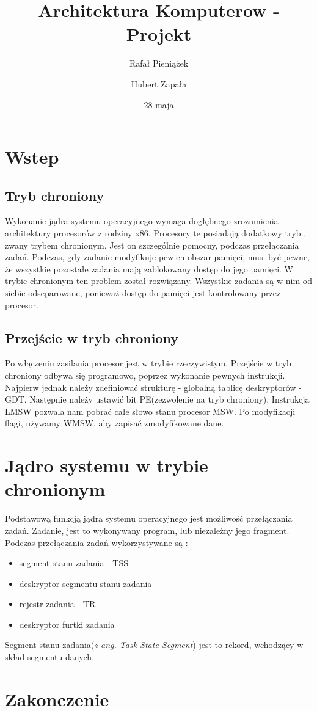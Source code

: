 \documentclass[a4paper,12pt]{report}
\title{Architektura Komputerow - Projekt}
\author{Rafał Pieniążek \and Hubert Zapała}
\date{28 maja}
\begin{document}
\maketitle
\tableofcontents %

	
	\section{Wstep}

	\subsection{Tryb chroniony}
	Wykonanie jądra systemu operacyjnego wymaga dogłębnego zrozumienia architektury procesorów z rodziny x86. Procesory te posiadają dodatkowy tryb , zwany trybem chronionym. Jest on szczególnie pomocny, podczas przełączania zadań. Podczas, gdy zadanie modyfikuje pewien obszar pamięci, musi być pewne, że wszystkie pozostałe zadania mają zablokowany dostęp do jego pamięci. W trybie chronionym ten problem został rozwiązany. Wszystkie zadania są w nim od siebie odseparowane, ponieważ dostęp do pamięci jest kontrolowany przez procesor. 

	\subsection{Przejście w tryb chroniony}
	Po włączeniu zasilania procesor jest w trybie rzeczywistym. Przejście w tryb chroniony odbywa się programowo, poprzez wykonanie pewnych instrukcji. Najpierw jednak należy zdefiniować strukturę - globalną tablicę deskryptorów - GDT.  Następnie należy ustawić bit PE(zezwolenie na tryb chroniony). Instrukcja LMSW pozwala nam pobrać całe słowo stanu procesor MSW. Po modyfikacji flagi, używamy WMSW, aby zapisać zmodyfikowane dane.
	\section{Jądro systemu w trybie chronionym}
	
	Podstawową funkcją jądra systemu operacyjnego jest możliwość przełączania zadań. Zadanie, jest to wykonywany program, lub niezależny jego fragment. Podczas przełączania zadań wykorzystywane są :
	\begin{itemize}
	\item{segment stanu zadania - TSS}
	\item{deskryptor segmentu stanu zadania}
	\item{rejestr zadania - TR}
	\item{deskryptor furtki zadania}
	\end{itemize}
Segment stanu zadania(\textit{z ang. Task State Segment}) jest to rekord, wchodzący w skład segmentu danych. 
	\subsection{}
	\section{Zakonczenie}

	
\end{document}
